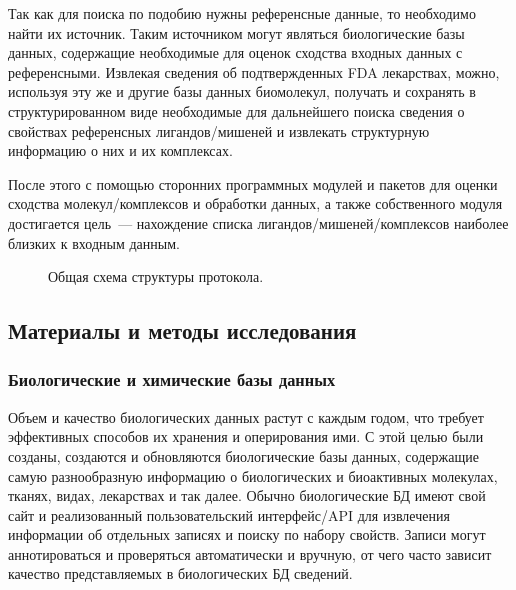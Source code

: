 \documentclass[a4paper,14pt]{article}         %
\begin{document}
Так как для поиска по подобию нужны референсные данные, то необходимо найти их источник. Таким источником могут являться биологические базы данных, содержащие необходимые для оценок сходства входных данных с референсными. Извлекая сведения об подтвержденных FDA лекарствах, можно, используя эту же и другие базы данных биомолекул, получать и сохранять в структурированном виде необходимые для дальнейшего поиска сведения о свойствах референсных лигандов/мишеней и извлекать структурную информацию о них и их комплексах.

После этого с помощью сторонних программных модулей и пакетов для оценки сходства молекул/комплексов и обработки данных, а также собственного модуля достигается цель~--- нахождение списка лигандов/мишеней/комплексов наиболее близких к входным данным.

\begin{figure}[hp]
		\caption{Общая схема структуры протокола.}
		\label{structure}
\end{figure}

\newpage
\subsection{Материалы и методы исследования}
\subsubsection{Биологические и химические базы данных}
Объем и качество биологических данных растут с каждым годом, что требует эффективных способов их хранения и оперирования ими. С этой целью были созданы, создаются и обновляются биологические базы данных, содержащие самую разнообразную информацию о биологических и биоактивных молекулах, тканях, видах, лекарствах и так далее. Обычно биологические БД имеют свой сайт и реализованный пользовательский интерфейс/API для извлечения информации об отдельных записях и поиску по набору свойств. Записи могут аннотироваться и проверяться автоматически и вручную, от чего часто зависит качество представляемых в биологических БД сведений.
\end{document}
